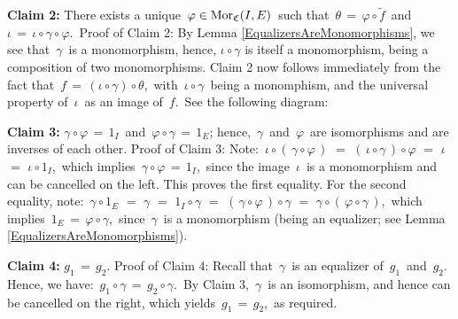 \vskip 0.3cm
\noindent
\textbf{Claim 2:}\;\; There exists a unique \,$\varphi \in \textnormal{Mor}_{\mathfrak{C}}(I,E)$\, such that
\,$\theta \,=\, \varphi \circ \widetilde{f}$\,
and
\,$\iota \,=\, \iota \circ \gamma \circ \varphi$.\,
\vskip 0.1cm
\noindent
Proof of Claim 2:\; 
By Lemma \ref{EqualizersAreMonomorphisms}, we see that \,$\gamma$\, is a monomorphism,
hence, $\iota \circ \gamma$ is itself a monomorphism, being a composition of two monomorphisms.
Claim 2 now follows immediately from the fact that
\,$f \,=\, (\iota \circ \gamma) \circ \theta$,\,
with \,$\iota \circ \gamma$\, being a monomphism,
and the universal property of \,$\iota$\, as an image of \,$f$.\,
See the following diagram:
\begin{center}
\end{center}

\vskip 0.3cm
\noindent
\textbf{Claim 3:}\;\; $\gamma \circ \varphi \,=\, 1_{I}$\, and \,$\varphi \circ \gamma \,=\, 1_{E}$;
hence, \,$\gamma$\, and \,$\varphi$\, are isomorphisms and are inverses of each other.
\vskip 0.1cm
\noindent
Proof of Claim 3:\;  Note:
\,$\iota \circ (\,\gamma \circ \varphi\,)$
\;$=$\; $(\,\iota \circ \gamma\,) \circ \varphi$
\;$=$\; $\iota$
\;$=$\; $\iota \circ 1_{I}$,\,
which implies
\,$\gamma \circ \varphi \,=\, 1_{I}$,\,
since the image \,$\iota$\, is a monomorphism and can be cancelled on the left.
This proves the first equality.
For the second equality, note:
\,$\gamma \circ 1_{E}$
\;$=$\; $\gamma$
\;$=$\; $1_{I} \circ \gamma$
\;$=$\; $(\,\gamma \circ \varphi\,) \circ \gamma$
\;$=$\; $\gamma \circ (\,\varphi \circ \gamma\,)$,\,
which implies
\,$1_{E} \,=\, \varphi \circ \gamma$,\,
since \,$\gamma$\, is a monomorphism (being an equalizer; see Lemma \ref{EqualizersAreMonomorphisms}).

\vskip 0.4cm
\noindent
\textbf{Claim 4:}\;\; $g_{1} \,=\, g_{2}$.
\vskip 0.1cm
\noindent
Proof of Claim 4:\;  Recall that \,$\gamma$\, is an equalizer of \,$g_{1}$\, and \,$g_{2}$.\,
Hence, we have: \,$g_{1} \circ \gamma \,=\, g_{2} \circ \gamma$.\,
By Claim 3, \,$\gamma$\, is an isomorphism, and hence can be cancelled on the right,
which yields \,$g_{1} \,=\, g_{2}$,\, as required.

